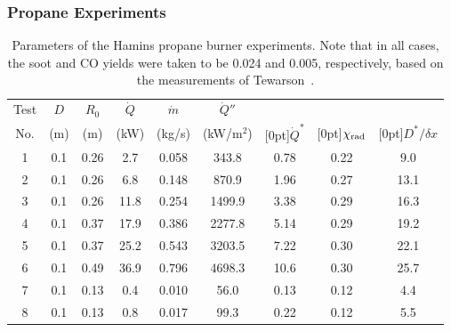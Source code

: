 \clearpage

\subsubsection{Propane Experiments}

\begin{table}[!h]
\caption[Parameters of the Hamins propane burner experiments]{Parameters of the Hamins propane burner experiments. Note that in all cases, the soot and CO yields were taken to be 0.024 and 0.005, respectively, based on the measurements of Tewarson~\cite{SFPE:Tewarson}.}
\begin{center}
\begin{tabular}{|c|c|c|c|c|c|c||c|c|}
\hline
Test     & $D$      & $R_0$      & $\dot{Q}$   &  $\dot{m}$            &  $\dot{Q}''$   &               &           &           \\
No.      & (m)      & (m)        & (kW)        &  (kg/s)               &  (kW/m$^2$)    & \raisebox{1.5ex}[0pt]{$\dot{Q}^*$} & \raisebox{1.5ex}[0pt]{$\chi_{\rm rad}$} & \raisebox{1.5ex}[0pt]{$D^*/\delta x$} \\ \hline \hline
1        & 0.1      & 0.26       & 2.7         &  0.058                &  343.8         & 0.78          & 0.22      & 9.0          \\ \hline
2        & 0.1      & 0.26       & 6.8         &  0.148                &  870.9         & 1.96          & 0.27      & 13.1          \\ \hline
3        & 0.1      & 0.26       & 11.8        &  0.254                &  1499.9        & 3.38          & 0.29      & 16.3          \\ \hline
4        & 0.1      & 0.37       & 17.9        &  0.386                &  2277.8        & 5.14          & 0.29      & 19.2          \\ \hline
5        & 0.1      & 0.37       & 25.2        &  0.543                &  3203.5        & 7.22          & 0.30      & 22.1          \\ \hline
6        & 0.1      & 0.49       & 36.9        &  0.796                &  4698.3        & 10.6          & 0.30      & 25.7          \\ \hline
7        & 0.1      & 0.13       & 0.4         &  0.010                &  56.0          & 0.13          & 0.12      & 4.4          \\ \hline
8        & 0.1      & 0.13       & 0.8         &  0.017                &  99.3          & 0.22          & 0.12      & 5.5          \\ \hline

\end{tabular}
\end{center}
\end{table}
